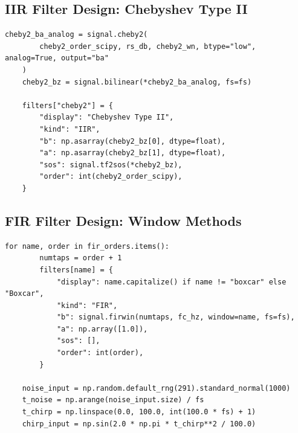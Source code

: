 \documentclass[12pt, a4paper]{article}
\begin{document}
\subsection{IIR Filter Design: Chebyshev Type II}
\begin{lstlisting}[caption={Chebyshev Type II design code.}, label={lst:lab02_cheby2}]
    cheby2_ba_analog = signal.cheby2(
        cheby2_order_scipy, rs_db, cheby2_wn, btype="low", analog=True, output="ba"
    )
    cheby2_bz = signal.bilinear(*cheby2_ba_analog, fs=fs)

    filters["cheby2"] = {
        "display": "Chebyshev Type II",
        "kind": "IIR",
        "b": np.asarray(cheby2_bz[0], dtype=float),
        "a": np.asarray(cheby2_bz[1], dtype=float),
        "sos": signal.tf2sos(*cheby2_bz),
        "order": int(cheby2_order_scipy),
    }
\end{lstlisting}

\subsection{FIR Filter Design: Window Methods}
\begin{lstlisting}[caption={FIR window-method designs for Lab 02.}, label={lst:lab02_fir}]
    for name, order in fir_orders.items():
        numtaps = order + 1
        filters[name] = {
            "display": name.capitalize() if name != "boxcar" else "Boxcar",
            "kind": "FIR",
            "b": signal.firwin(numtaps, fc_hz, window=name, fs=fs),
            "a": np.array([1.0]),
            "sos": [],
            "order": int(order),
        }

    noise_input = np.random.default_rng(291).standard_normal(1000)
    t_noise = np.arange(noise_input.size) / fs
    t_chirp = np.linspace(0.0, 100.0, int(100.0 * fs) + 1)
    chirp_input = np.sin(2.0 * np.pi * t_chirp**2 / 100.0)
\end{lstlisting}
\end{document}
